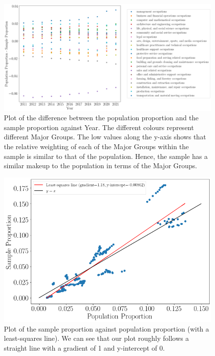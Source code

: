 \documentclass[11pt]{article}
\begin{document}
\begin{figure}[!htb]
	\centering
	\includegraphics[width=17cm]{Figures/sample test2.png}
	\caption{Plot of the difference between the population proportion and the sample proportion against Year. The different colours represent different Major Groups. The low values along the y-axis shows that the relative weighting of each of the Major Groups within the sample is similar to that of the population. Hence, the sample has a similar makeup to the population in terms of the Major Groups.}
	\label{fig:relativeweightage}
\end{figure}

\begin{figure}[!htb]
	\centering
	\includegraphics[width=15cm]{Figures/Sample Proportion against Population Proportion2.png}
	\caption{Plot of the sample proportion against population proportion (with a least-squares line). We can see that our plot roughly follows a straight line with a gradient of 1 and y-intercept of 0.}
	\label{fig:sampleprop vs popprop}
\end{figure}
\end{document}
